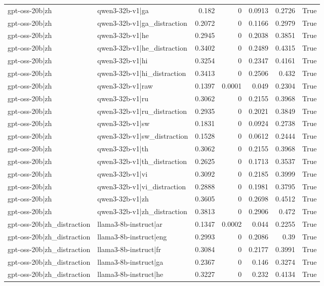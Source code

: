 \begin{table}
\begin{tabular}{l l r r r r l}
gpt-oss-20b|zh & qwen3-32b-v1|ga & 0.182 & 0 & 0.0913 & 0.2726 & True \\
gpt-oss-20b|zh & qwen3-32b-v1|ga_distraction & 0.2072 & 0 & 0.1166 & 0.2979 & True \\
gpt-oss-20b|zh & qwen3-32b-v1|he & 0.2945 & 0 & 0.2038 & 0.3851 & True \\
gpt-oss-20b|zh & qwen3-32b-v1|he_distraction & 0.3402 & 0 & 0.2489 & 0.4315 & True \\
gpt-oss-20b|zh & qwen3-32b-v1|hi & 0.3254 & 0 & 0.2347 & 0.4161 & True \\
gpt-oss-20b|zh & qwen3-32b-v1|hi_distraction & 0.3413 & 0 & 0.2506 & 0.432 & True \\
gpt-oss-20b|zh & qwen3-32b-v1|raw & 0.1397 & 0.0001 & 0.049 & 0.2304 & True \\
gpt-oss-20b|zh & qwen3-32b-v1|ru & 0.3062 & 0 & 0.2155 & 0.3968 & True \\
gpt-oss-20b|zh & qwen3-32b-v1|ru_distraction & 0.2935 & 0 & 0.2021 & 0.3849 & True \\
gpt-oss-20b|zh & qwen3-32b-v1|sw & 0.1831 & 0 & 0.0924 & 0.2738 & True \\
gpt-oss-20b|zh & qwen3-32b-v1|sw_distraction & 0.1528 & 0 & 0.0612 & 0.2444 & True \\
gpt-oss-20b|zh & qwen3-32b-v1|th & 0.3062 & 0 & 0.2155 & 0.3968 & True \\
gpt-oss-20b|zh & qwen3-32b-v1|th_distraction & 0.2625 & 0 & 0.1713 & 0.3537 & True \\
gpt-oss-20b|zh & qwen3-32b-v1|vi & 0.3092 & 0 & 0.2185 & 0.3999 & True \\
gpt-oss-20b|zh & qwen3-32b-v1|vi_distraction & 0.2888 & 0 & 0.1981 & 0.3795 & True \\
gpt-oss-20b|zh & qwen3-32b-v1|zh & 0.3605 & 0 & 0.2698 & 0.4512 & True \\
gpt-oss-20b|zh & qwen3-32b-v1|zh_distraction & 0.3813 & 0 & 0.2906 & 0.472 & True \\
gpt-oss-20b|zh_distraction & llama3-8b-instruct|ar & 0.1347 & 0.0002 & 0.044 & 0.2255 & True \\
gpt-oss-20b|zh_distraction & llama3-8b-instruct|eng & 0.2993 & 0 & 0.2086 & 0.39 & True \\
gpt-oss-20b|zh_distraction & llama3-8b-instruct|fr & 0.3084 & 0 & 0.2177 & 0.3991 & True \\
gpt-oss-20b|zh_distraction & llama3-8b-instruct|ga & 0.2367 & 0 & 0.146 & 0.3274 & True \\
gpt-oss-20b|zh_distraction & llama3-8b-instruct|he & 0.3227 & 0 & 0.232 & 0.4134 & True \\

\end{tabular}
\end{table}
